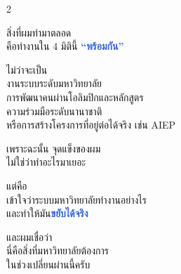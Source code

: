 \documentclass[10pt]{article}
\begin{document}
\begin{tcolorbox}[breakable,colback=panel,colframe=line,boxrule=0.5pt,arc=2mm,left=3mm,right=3mm,top=2mm,bottom=2mm]
\begin{multicols}{2}
\par สิ่งที่ผมทำมาตลอด\\ คือทำงานใน 4 มิตินี้ \textbf{\textcolor{highlight}{“พร้อมกัน”}}
\par ไม่ว่าจะเป็น\\ งานระบบระดับมหาวิทยาลัย\\ การพัฒนาคนผ่านโอลิมปิกและหลักสูตร\\ ความร่วมมือระดับนานาชาติ\\ หรือการสร้างโครงการที่อยู่ต่อได้จริง เช่น AIEP
\par เพราะฉะนั้น จุดแข็งของผม\\ ไม่ใช่ว่าทำอะไรมาเยอะ
\par แต่คือ\\ เข้าใจว่าระบบมหาวิทยาลัยทำงานอย่างไร\\ และทำให้มัน\textbf{\textcolor{highlight}{ขยับได้จริง}}
\par และผมเชื่อว่า\\ นี่คือสิ่งที่มหาวิทยาลัยต้องการ\\ ในช่วงเปลี่ยนผ่านนี้ครับ
\end{multicols}
\end{tcolorbox}

\clearpage
\end{document}
